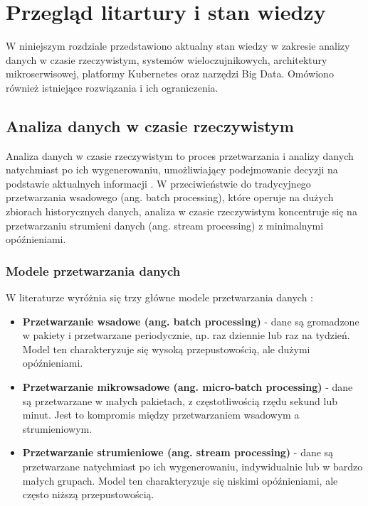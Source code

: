 \section{Przegląd litartury i stan wiedzy}
\label{sec:przeglad_literatury}

W niniejszym rozdziale przedstawiono aktualny stan wiedzy w zakresie analizy danych w czasie rzeczywistym, systemów wieloczujnikowych,
architektury mikroserwisowej, platformy Kubernetes oraz narzędzi Big Data. Omówiono również istniejące rozwiązania i ich ograniczenia.

\subsection{Analiza danych w czasie rzeczywistym}
\label{subsec:analiza_danych}

Analiza danych w czasie rzeczywistym to proces przetwarzania i analizy danych natychmiast po ich wygenerowaniu,
umożliwiający podejmowanie decyzji na podstawie aktualnych informacji \citep{realtime_analytics}. W przeciwieństwie do tradycyjnego przetwarzania
wsadowego (ang. batch processing), które operuje na dużych zbiorach historycznych danych, analiza w czasie rzeczywistym koncentruje się na przetwarzaniu
strumieni danych (ang. stream processing) z minimalnymi opóźnieniami.

\subsubsection{Modele przetwarzania danych}
\label{subsubsec:modele_przetwarzania}

W literaturze wyróżnia się trzy główne modele przetwarzania danych \citep{data_processing_models}:

\begin{itemize}
    \item \textbf{Przetwarzanie wsadowe (ang. batch processing)} - dane są gromadzone w pakiety i przetwarzane periodycznie, np. raz dziennie lub raz na tydzień. Model ten charakteryzuje się wysoką przepustowością, ale dużymi opóźnieniami.
    \item \textbf{Przetwarzanie mikrowsadowe (ang. micro-batch processing)} - dane są przetwarzane w małych pakietach, z częstotliwością rzędu sekund lub minut. Jest to kompromis między przetwarzaniem wsadowym a strumieniowym.
    \item \textbf{Przetwarzanie strumieniowe (ang. stream processing)} - dane są przetwarzane natychmiast po ich wygenerowaniu, indywidualnie lub w bardzo małych grupach. Model ten charakteryzuje się niskimi opóźnieniami, ale często niższą przepustowością.
\end{itemize}


